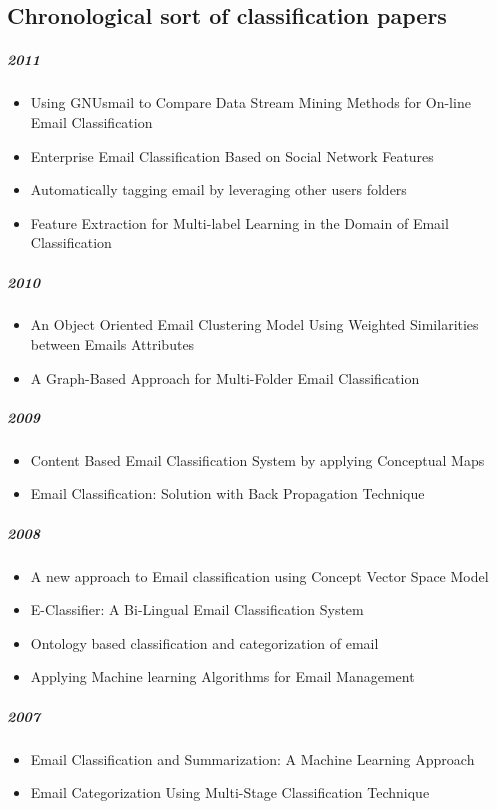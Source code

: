\documentclass[12pt]{article}
\begin{document}
\newpage
\subsection{Chronological sort of classification papers}
\subparagraph{2011}
\begin{itemize}
\item Using GNUsmail to Compare Data Stream Mining Methods for On-line Email Classification
\item Enterprise Email Classification Based on Social Network Features
\item Automatically tagging email by leveraging other users folders
\item Feature Extraction for Multi-label Learning in the Domain of Email Classification
\end{itemize}

\subparagraph{2010}
\begin{itemize}
\item An Object Oriented Email Clustering Model Using Weighted Similarities between Emails Attributes
\item A Graph-Based Approach for Multi-Folder Email Classification
\end{itemize}

\subparagraph{2009}
\begin{itemize}
\item Content Based Email Classification System by applying Conceptual Maps
\item Email Classification: Solution with Back Propagation Technique
\end{itemize}

\subparagraph{2008}
\begin{itemize}
\item A new approach to Email classification using Concept Vector Space Model
\item E-Classifier: A Bi-Lingual Email Classification System
\item Ontology based classification and categorization of email
\item Applying Machine learning Algorithms for Email Management
\end{itemize}

\subparagraph{2007}
\begin{itemize}
\item Email Classification and Summarization: A Machine Learning Approach
\item Email Categorization Using Multi-Stage Classification Technique
\end{itemize}
\end{document}
